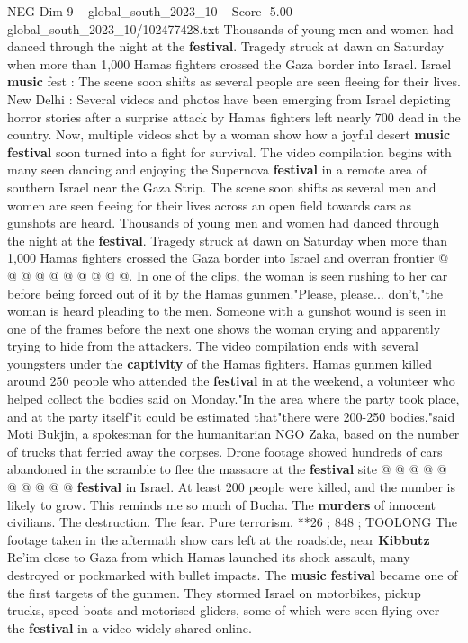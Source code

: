 \begin{textsample}{NEG Dim 9 – global\_south\_2023\_10 – Score -5.00 – global\_south\_2023\_10/102477428.txt}  \label{ex:f9_neg_370}
Thousands of young men and women had danced through the night at the \textbf{festival}.
Tragedy struck at dawn on Saturday when more than 1,000 Hamas fighters crossed the Gaza border into Israel.
Israel \textbf{music} fest : The scene soon shifts as several people are seen fleeing for their lives.
New Delhi : Several videos and photos have been emerging from Israel depicting horror stories after a surprise attack by Hamas fighters left nearly 700 dead in the country.
Now, multiple videos shot by a woman show how a joyful desert \textbf{music} \textbf{festival} soon turned into a fight for survival.
The video compilation begins with many seen dancing and enjoying the Supernova \textbf{festival} in a remote area of southern Israel near the Gaza Strip.
The scene soon shifts as several men and women are seen fleeing for their lives across an open field towards cars as gunshots are heard.
Thousands of young men and women had danced through the night at the \textbf{festival}.
Tragedy struck at dawn on Saturday when more than 1,000 Hamas fighters crossed the Gaza border into Israel and overran frontier @ @ @ @ @ @ @ @ @ @.
In one of the clips, the woman is seen rushing to her car before being forced out of it by the Hamas gunmen."Please, please... don't,"the woman is heard pleading to the men.
Someone with a gunshot wound is seen in one of the frames before the next one shows the woman crying and apparently trying to hide from the attackers.
The video compilation ends with several youngsters under the \textbf{captivity} of the Hamas fighters.
Hamas gunmen killed around 250 people who attended the \textbf{festival} in at the weekend, a volunteer who helped collect the bodies said on Monday."In the area where the party took place, and at the party itself"it could be estimated that"there were 200-250 bodies,"said Moti Bukjin, a spokesman for the humanitarian NGO Zaka, based on the number of trucks that ferried away the corpses.
Drone footage showed hundreds of cars abandoned in the scramble to flee the massacre at the \textbf{festival} site @ @ @ @ @ @ @ @ @ @ \textbf{festival} in Israel.
At least 200 people were killed, and the number is likely to grow.
This reminds me so much of Bucha.
The \textbf{murders} of innocent civilians.
The destruction.
The fear.
Pure terrorism. **26 ; 848 ; TOOLONG The footage taken in the aftermath show cars left at the roadside, near \textbf{Kibbutz} Re'im close to Gaza from which Hamas launched its shock assault, many destroyed or pockmarked with bullet impacts.
The \textbf{music} \textbf{festival} became one of the first targets of the gunmen.
They stormed Israel on motorbikes, pickup trucks, speed boats and motorised gliders, some of which were seen flying over the \textbf{festival} in a video widely shared online.

\end{textsample}
